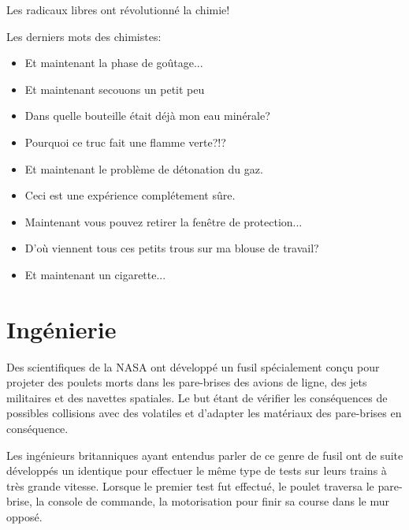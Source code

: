 \begin{center}\underline{\hspace{5 cm}}\end{center}

Les radicaux libres ont révolutionné la chimie!

\begin{center}\underline{\hspace{5 cm}}\end{center}

Les derniers mots des chimistes: 

\begin{itemize}
	\item Et maintenant la phase de goûtage...

	\item  Et maintenant secouons un petit peu

	\item  Dans quelle bouteille était déjà mon eau minérale?

	\item  Pourquoi ce truc fait une flamme verte?!?

	\item  Et maintenant le problème de détonation du gaz.

	\item  Ceci est une expérience complétement sûre.

	\item  Maintenant vous pouvez retirer la fenêtre de protection...

	\item  D'où viennent tous ces petits trous sur ma blouse de travail?

	\item  Et maintenant un cigarette...
\end{itemize}

	\pagebreak
	\section{Ingénierie}

	Des scientifiques de la NASA ont développé un fusil spécialement conçu pour projeter des poulets morts dans les pare-brises des avions de ligne, des jets militaires et des navettes spatiales. Le but étant de vérifier les conséquences de possibles collisions avec des volatiles et d'adapter les matériaux des pare-brises en conséquence.

	Les ingénieurs britanniques ayant entendus parler de ce genre de fusil ont de suite développés un identique pour effectuer le même type de tests sur leurs trains à très grande vitesse. Lorsque le premier test fut effectué, le poulet traversa le pare-brise, la console de commande, la motorisation pour finir sa course dans le mur opposé. 

